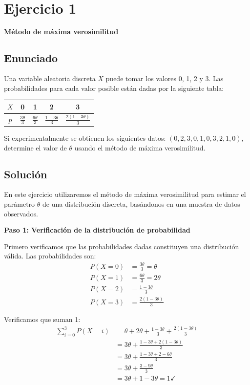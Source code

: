 \documentclass[11pt,a4paper]{article}
\begin{document}
\tableofcontents
\newpage

\section{Ejercicio 1}
\textbf{Método de máxima verosimilitud}

\subsection{Enunciado}
Una variable aleatoria discreta $X$ puede tomar los valores 0, 1, 2 y 3. Las probabilidades para cada valor posible están dadas por la siguiente tabla:

\begin{center}
\begin{tabular}{|c|c|c|c|c|}
\hline
$X$ & 0 & 1 & 2 & 3 \\
\hline
$p$ & $\frac{3\theta}{3}$ & $\frac{6\theta}{3}$ & $\frac{1-3\theta}{3}$ & $\frac{2(1-3\theta)}{3}$ \\
\hline
\end{tabular}
\end{center}

Si experimentalmente se obtienen los siguientes datos:
$(0, 2, 3, 0, 1, 0, 3, 2, 1, 0)$,
determine el valor de $\theta$ usando el método de máxima verosimilitud.

\subsection{Solución}

En este ejercicio utilizaremos el método de máxima verosimilitud para estimar el parámetro $\theta$ de una distribución discreta, basándonos en una muestra de datos observados.

\textbf{Paso 1: Verificación de la distribución de probabilidad}

Primero verificamos que las probabilidades dadas constituyen una distribución válida. Las probabilidades son:
\begin{align*}
P(X=0) &= \frac{3\theta}{3} = \theta \\
P(X=1) &= \frac{6\theta}{3} = 2\theta \\
P(X=2) &= \frac{1-3\theta}{3} \\
P(X=3) &= \frac{2(1-3\theta)}{3}
\end{align*}

Verificamos que suman 1:
\begin{align*}
\sum_{i=0}^{3} P(X=i) &= \theta + 2\theta + \frac{1-3\theta}{3} + \frac{2(1-3\theta)}{3} \\
&= 3\theta + \frac{1-3\theta + 2(1-3\theta)}{3} \\
&= 3\theta + \frac{1-3\theta + 2-6\theta}{3} \\
&= 3\theta + \frac{3-9\theta}{3} \\
&= 3\theta + 1 - 3\theta = 1 \checkmark
\end{align*}
\end{document}
